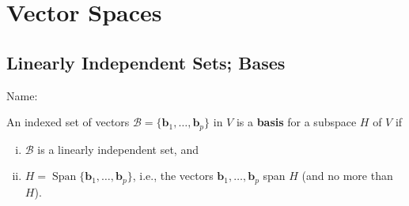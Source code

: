 \documentclass[10pt]{book}
\newcommand{\boxcolor}{gray!30}
\newenvironment{boxdef}{\begin{mdframed}[backgroundcolor=\boxcolor,linewidth=0pt,nobreak=true]}{\end{mdframed}}
\theoremstyle{definition}
\newcommand{\name}[1][2.5in]{\vspace{-2.3em}\hfill Name: \underline{\hspace{#1}}}
\newcommand{\B}{\mathscr{B}}
\newcommand{\vect}[1]{\ensuremath{\boldsymbol{\mathbf{#1}}}}
\DeclareMathOperator{\Span}{Span}
\newcommand{\vectset}[3][v]{\{\vect{#1}_{#2},\ldots,\vect{#1}_{#3}\}}
\begin{document}


\chapter{Vector Spaces}
\setcounter{section}{0}




\setcounter{section}{2}
\section{Linearly Independent Sets; Bases}
\name[2in]


\begin{boxdef}
An indexed set of vectors $\B=\vectset[b]{1}{p}$ in $V$ is a \textbf{basis} for a subspace $H$ of $V$ if
\begin{enumerate}[(i)]
	\item $\B$ is a linearly independent set, and
	\item $H=\Span\vectset[b]{1}{p}$, i.e., the vectors $\vect{b}_1,\ldots,\vect{b}_p$ span $H$ (and no more than $H$).
\end{enumerate}
\end{boxdef}
\end{document}
